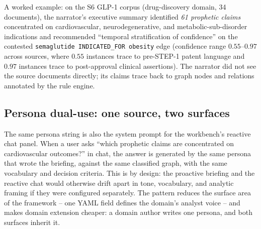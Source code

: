 A worked example: on the S6 GLP-1 corpus (drug-discovery domain, 34 documents), the narrator's executive summary identified \emph{61 prophetic claims} concentrated on cardiovascular, neurodegenerative, and metabolic-sub-disorder indications and recommended ``temporal stratification of confidence'' on the contested \texttt{semaglutide INDICATED\_FOR obesity} edge (confidence range $0.55$--$0.97$ across sources, where $0.55$ instances trace to pre-STEP-1 patent language and $0.97$ instances trace to post-approval clinical assertions). The narrator did not see the source documents directly; its claims trace back to graph nodes and relations annotated by the rule engine.

\subsection{Persona dual-use: one source, two surfaces}

The same persona string is also the system prompt for the workbench's reactive chat panel. When a user asks ``which prophetic claims are concentrated on cardiovascular outcomes?'' in chat, the answer is generated by the same persona that wrote the briefing, against the same classified graph, with the same vocabulary and decision criteria. This is by design: the proactive briefing and the reactive chat would otherwise drift apart in tone, vocabulary, and analytic framing if they were configured separately. The pattern reduces the surface area of the framework -- one YAML field defines the domain's analyst voice -- and makes domain extension cheaper: a domain author writes one persona, and both surfaces inherit it.
